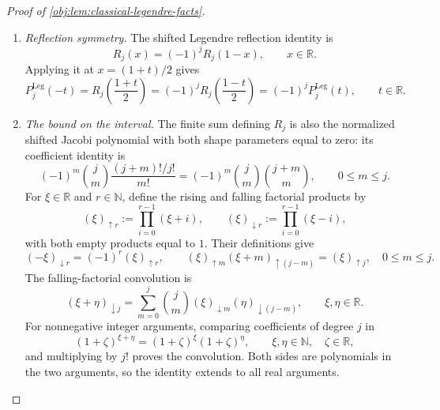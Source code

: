 \begin{proof}[Proof of \cref{obj:lem:classical-legendre-facts}]
\begin{enumerate}
If \(j<k\), the degree of \(R_j\) is \(j\), so \(R_j^{(k)}=0\). Thus
\[
k!\int_0^1R_j(x)R_k(x)\,dx
=(-1)^k\int_0^1R_j^{(k)}(x)\mathcal B_k(x)\,dx
=0,
\]
and the inner product vanishes. If \(k<j\), interchange the two factors and apply the same calculation. Hence
\[
\int_0^1R_j(x)R_k(x)\,dx
=
\begin{cases}
\dfrac{1}{2j+1},&j=k,\\
0,&j\ne k.
\end{cases}
\]
Multiplying the affine-substitution identity by \(2\) proves the asserted inner product on \([-1,1]\).

\item \emph{Reflection symmetry.}
The shifted Legendre reflection identity is
\[
R_j(x)=(-1)^jR_j(1-x),
\qquad x\in\mathbb R.
\]
Applying it at \(x=(1+t)/2\) gives
\[
P_j^{\mathrm{Leg}}(-t)
=R_j\!\left(\frac{1+t}{2}\right)
=(-1)^jR_j\!\left(\frac{1-t}{2}\right)
=(-1)^jP_j^{\mathrm{Leg}}(t),
\qquad t\in\mathbb R.
\]

\item \emph{The bound on the interval.}
The finite sum defining \(R_j\) is also the normalized shifted Jacobi polynomial with both shape parameters equal to zero: its coefficient identity is
\[
(-1)^m\binom jm
\frac{(j+m)!/j!}{m!}
=(-1)^m\binom jm\binom{j+m}{m},
\qquad 0\le m\le j.
\]
For \(\xi\in\mathbb R\) and \(r\in\mathbb N\), define the rising and falling factorial products by
\[
(\xi)_{\uparrow r}:=\prod_{i=0}^{r-1}(\xi+i),
\qquad
(\xi)_{\downarrow r}:=\prod_{i=0}^{r-1}(\xi-i),
\]
with both empty products equal to \(1\). Their definitions give
\[
(-\xi)_{\downarrow r}=(-1)^r(\xi)_{\uparrow r},
\qquad
(\xi)_{\uparrow m}(\xi+m)_{\uparrow(j-m)}
=(\xi)_{\uparrow j},
\quad 0\le m\le j.
\]
The falling-factorial convolution is
\[
(\xi+\eta)_{\downarrow j}
=\sum_{m=0}^j\binom jm
  (\xi)_{\downarrow m}(\eta)_{\downarrow(j-m)},
\qquad \xi,\eta\in\mathbb R.
\]
For nonnegative integer arguments, comparing coefficients of degree \(j\) in
\[
(1+\zeta)^{\xi+\eta}
=(1+\zeta)^\xi(1+\zeta)^\eta,
\qquad \xi,\eta\in\mathbb N,\quad \zeta\in\mathbb R,
\]
and multiplying by \(j!\) proves the convolution. Both sides are polynomials in the two arguments, so the identity extends to all real arguments.


\end{enumerate}
\end{proof}
